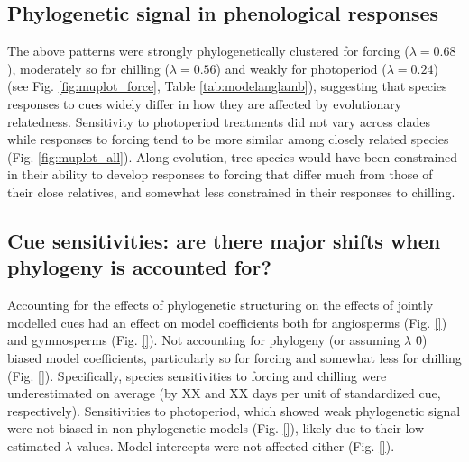 \documentclass{article}\usepackage[]{graphicx}\usepackage[]{color}
\begin{document}
\subsection*{Phylogenetic signal in phenological responses}
The above patterns were strongly phylogenetically clustered for forcing ($\lambda = 0.68$), moderately so for chilling ($\lambda = 0.56$) and weakly for photoperiod ($\lambda= 0.24$) (see Fig. \ref{fig:muplot_force}, Table \ref{tab:modelanglamb}), suggesting that species responses to cues widely differ in how they are affected by evolutionary relatedness. Sensitivity to photoperiod treatments did not vary across clades while responses to forcing tend to be more similar among closely related species (Fig. \ref{fig:muplot_all}). Along evolution, tree species would have been constrained %
in their ability to develop responses to forcing that differ much from those of their close relatives, and somewhat less constrained in their responses to chilling.\\ %


\subsection*{Cue sensitivities: are there major shifts when phylogeny is accounted for?}
Accounting for the effects of phylogenetic structuring on the effects of jointly modelled cues had an effect on model coefficients both for angiosperms (Fig. \ref{}) and gymnosperms (Fig. \ref{}). Not accounting for phylogeny (or assuming $\lambda$ \= 0) biased model coefficients, particularly so for forcing and somewhat less for chilling (Fig. \ref{}). Specifically, species sensitivities to forcing and chilling were underestimated on average (by XX and XX days per unit of standardized cue, respectively). Sensitivities to photoperiod, which showed weak phylogenetic signal were not biased in non-phylogenetic models (Fig. \ref{}), likely due to their low estimated $\lambda$ values. Model intercepts were not affected either (Fig. \ref{}).\\ 
\end{document}
